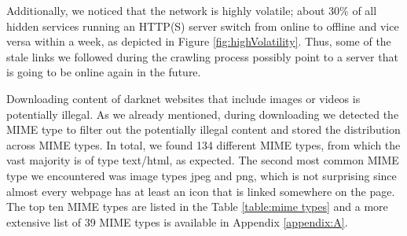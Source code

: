 Additionally, we noticed that the network is highly volatile; about $30\%$ of all hidden services running an HTTP(S) server switch from online to offline and vice versa within a week, as depicted in Figure \ref{fig:highVolatility}.
Thus, some of the stale links we followed during the crawling process possibly point to a server that is going to be online again in the future. 

Downloading content of darknet websites that include images or videos is potentially illegal. As we already mentioned, during downloading we detected the MIME type to filter out the potentially illegal content and stored the distribution across MIME types. In total, we found 134 different MIME types, from which the vast majority is of type text/html, as expected. The second most common MIME type we encountered was image types jpeg and png, which is not surprising since almost every webpage has at least an icon that is linked somewhere on the page. The top ten MIME types are listed in the Table \ref{table:mime types} and a more extensive list of 39 MIME types is available in Appendix \ref{appendix:A}.

